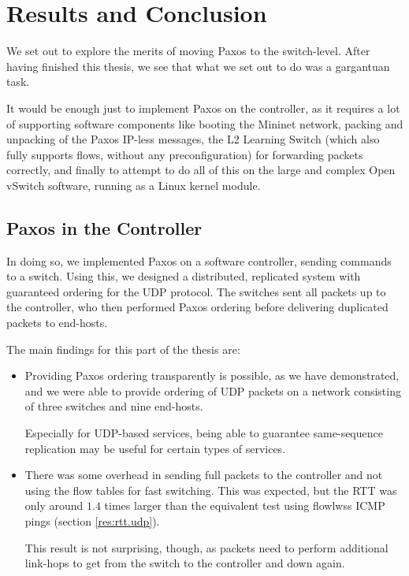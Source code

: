 \chapter{Results and Conclusion}
\label{chapter:conclusion}

We set out to explore the merits of moving Paxos to the switch-level.
After having finished this thesis, we see that what we set out to do was a
gargantuan task.

It would be enough just to implement Paxos on the
controller, as it requires a lot of supporting software components like
booting the Mininet network, packing and unpacking of the Paxos IP-less
messages, the L2 Learning Switch (which also fully supports flows, without
any preconfiguration) for forwarding packets correctly, and finally to
attempt to do all of this on the large and complex Open vSwitch software,
running as a Linux kernel module.

\section{Paxos in the Controller}

In doing so, we implemented Paxos on a software controller, sending commands
to a switch.  Using this, we designed a distributed, replicated system with
guaranteed ordering for the UDP protocol.  The switches sent all packets up
to the controller, who then performed Paxos ordering before delivering
duplicated packets to end-hosts.

The main findings for this part of the thesis are:

\begin{itemize}
  \item Providing Paxos ordering transparently is possible, as we have
  demonstrated, and we were able to provide ordering of \acs{UDP} packets on
  a network consisting of three switches and nine end-hosts.

  Especially for UDP-based services, being able to guarantee same-sequence
  replication may be useful for certain types of services.


  \item There was some overhead in sending full packets to the controller
  and not using the flow tables for fast switching.  This was expected, but
  the \acs{RTT} was only around $1.4$ times larger than the equivalent
  test using flowlwss ICMP pings (section \ref{res:rtt.udp}).

  This result is not surprising, though, as packets need to perform
  additional link-hops to get from the switch to the controller and down
  again.

\end{itemize}

